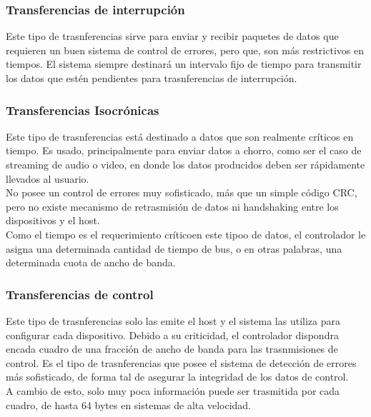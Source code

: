 	\subsubsection*{Transferencias de interrupción}
		Este tipo de trasnferencias sirve para enviar y recibir paquetes de datos que requieren un buen sistema de control de errores, pero que, son más restrictivos en tiempos. El sistema siempre destinará un intervalo fijo de tiempo para transmitir los datos que estén pendientes para trasnferencias de interrupción.\\
	
	\subsubsection*{Transferencias Isocrónicas}
		Este tipo de trasnferencias está destinado a datos que son realmente críticos en tiempo. Es usado, principalmente para enviar datos a chorro, como ser el caso de streaming de audio o video, en donde los datos producidos deben ser rápidamente llevados al usuario.\\
	
		No posee un control de errores muy sofisticado, más que un simple código CRC, pero no existe mecanismo de retrasmisión de datos ni handshaking entre los dispositivos y el host.\\
	
		Como el tiempo es el requerimiento críticoen este tipoo de datos, el controlador le asigna una determinada cantidad de tiempo de bus, o en otras palabras, una determinada cuota de ancho de banda.\\
	
	\subsubsection*{Transferencias de control}
		Este tipo de trasnferencias solo las emite el host y el sistema las utiliza para configurar cada dispositivo. Debido a su criticidad, el controlador dispondra encada cuadro de una fracción de ancho de banda para las trasnmisiones de control. Es el tipo de trasnferencias que posee el sistema de detección de errores más sofisticado, de forma tal de asegurar la integridad de los datos de control.\\
	
		A cambio de esto, solo muy poca información puede ser trasmitida por cada cuadro, de hasta 64 bytes en sistemas de alta velocidad.\\
	
